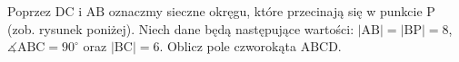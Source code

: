 Poprzez $\mathrm{DC}$ i $\mathrm{AB}$ oznaczmy sieczne okręgu, które przecinają się w punkcie $\mathrm{P}$ (zob. rysunek poniżej). Niech dane będą następujące wartości: $|\mathrm{AB}| = |\mathrm{BP}| = 8$, $\measuredangle \mathrm{ABC} = 90^\circ$ oraz $|\mathrm{BC}| = 6$. Oblicz pole czworokąta $\mathrm{ABCD}$.
\begin{figure}[htbp]
    \centering
    
\end{figure}